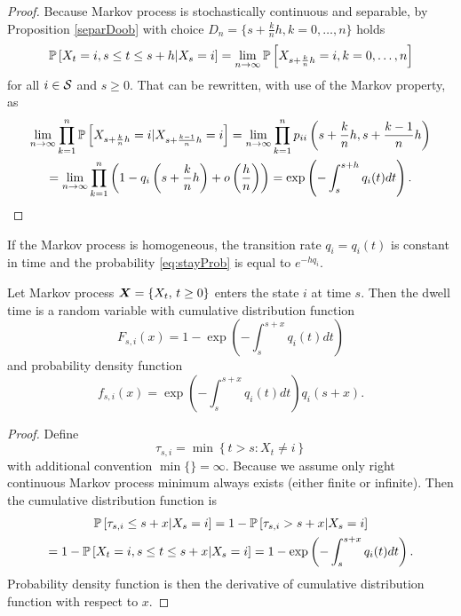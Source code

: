 {\begin{proof}
	Because Markov process is stochastically continuous and separable, by Proposition \ref{separDoob} with choice $D_n = \{s + \frac{k}{n} h, k = 0, \ldots, n \}$ holds
	\[
		\label{eq:stayProb}
		\pr \left[ X_t = i, s \leq t \leq s+h \vert X_s = i \right] = \lim_{n \to \infty} \pr \left[ X_{s + \frac{k}{n} h} = i, k = 0, \ldots, n \right]
	\]
	for all $i \in \S$ and $s \geq 0$. That can be rewritten, with use of the Markov property, as
	\begin{multline*}
		\lim_{n \to \infty} \prod_{k=1}^{n} \pr \left[ X_{s + \frac{k}{n} h} = i \vert X_{s + \frac{k-1}{n} h} = i \right]
		= \lim_{n \to \infty} \prod_{k=1}^{n} p_{ii} \left(s + \frac{k}{n} h, s + \frac{k-1}{n} h \right) \\
		= \lim_{n \to \infty} \prod_{k=1}^{n} \left( 1 - q_i \left(s + \frac{k}{n} h \right) + o \left( \frac{h}{n} \right) \right)
		= \exp \left(- \int_{s}^{s+h} q_i(t) dt \right).
	\end{multline*}
\end{proof}

If the Markov process is homogeneous, the transition rate $q_i = q_i (t)$ is constant in time and the probability \ref{eq:stayProb} is equal to $e^{- h q_i}$.

\begin{proposition} %
	\label{prop:dwellTime}
	Let Markov process $\procX$ enters the state $i$ at time $s$. Then the dwell time is a random variable with cumulative distribution function
	\[
		F_{s,i} (x) = 1 - \exp \left(- \int_{s}^{s+x} q_i(t) dt \right)
	\]
	and probability density function
	\[
		f_{s,i} (x) = \exp \left(- \int_{s}^{s+x} q_i(t) dt \right) q_i(s+x).
	\]
\end{proposition}

\begin{proof}
	Define
	\begin{equation}
		\label{eq:tausi}
		\tau_{s,i} = \min \left\{t>s: X_t \neq i \right\}
	\end{equation}
	with additional convention $\min \{ \} = \infty$. Because we assume only right continuous Markov process minimum always exists (either finite or infinite). Then the cumulative distribution function is
	\begin{multline*}
		\pr \left[ \tau_{s,i} \leq s+x \vert X_s = i \right]
		= 1 - \pr \left[ \tau_{s,i} > s+x \vert X_s = i \right] \\
		= 1 - \pr \left[ X_t = i, s \leq t \leq s+x \vert X_s = i \right]
		= 1 - \exp \left(- \int_{s}^{s+x} q_i(t) dt \right).
	\end{multline*}
	Probability density function is then the derivative of cumulative distribution function with respect to $x$.
\end{proof}

}
